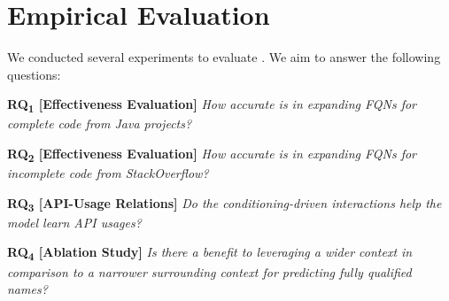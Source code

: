 \section{Empirical Evaluation}
\label{sec:evaluation}


We conducted several experiments to evaluate {\tool}. We aim to answer the following questions:

\vspace{2pt}
\noindent \textbf{RQ\textsubscript{1} 
  [Effectiveness Evaluation]} {\em How accurate is {\tool} in expanding FQNs for complete code from Java projects?}

\vspace{2pt}
\noindent \textbf{RQ\textsubscript{2} 
  [Effectiveness Evaluation]} {\em How accurate is {\tool} in expanding FQNs for incomplete code from StackOverflow?}

\vspace{2pt}
\noindent \textbf{RQ\textsubscript{3}
[API-Usage Relations]} {\em Do the conditioning-driven interactions help the model learn API usages?}

\vspace{2pt}
\noindent \textbf{RQ\textsubscript{4} 
  [Ablation Study]}  {\em Is there a benefit to leveraging a wider context in comparison to a narrower surrounding context for predicting fully qualified names?}





%
